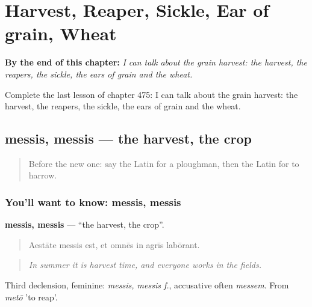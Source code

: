 
\chapter{Harvest, Reaper, Sickle, Ear of grain, Wheat}
\label{ch:la-harvest-reaper-sickle-ear-of-grain-wheat}

\begin{chapteropening}
\textbf{By the end of this chapter:} \emph{I can talk about the grain harvest: the harvest, the reapers, the sickle, the ears of grain and the wheat.}

Complete the last lesson of chapter 475: I can talk about the grain harvest: the harvest, the reapers, the sickle, the ears of grain and the wheat.
\end{chapteropening}

\section[messis, messis]{messis, messis — the harvest, the crop}

\label{lesson:LA-C475-messis}



\begin{quote}
Before the new one: say the Latin for a ploughman, then the Latin for to harrow.
\end{quote}

\subsection*{You'll want to know: messis, messis}
\textbf{messis, messis} — \textquotedblleft{}the harvest, the crop\textquotedblright{}.

\begin{quote}
Aestāte messis est, et omnēs in agrīs labōrant.
\end{quote}

\begin{quote}
\emph{In summer it is harvest time, and everyone works in the fields.}
\end{quote}

Third declension, feminine: \emph{messis, messis f.}, accusative often \emph{messem}. From \emph{metō} 'to reap'.

